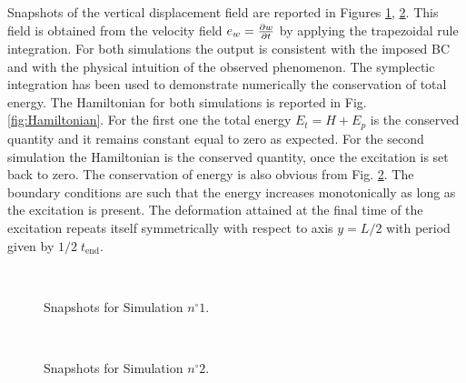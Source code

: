 \documentclass[11t]{article}
\begin{document}
Snapshots of the vertical displacement field are reported in Figures \ref{fig:sim1}, \ref{fig:sim2}. This field is obtained from the velocity field $e_w = \diffp{w}{t}$ by applying the trapezoidal rule integration. For both simulations the output is consistent with the imposed BC and with the physical intuition of the observed phenomenon. The symplectic integration has been used to demonstrate numerically the conservation of total energy. The Hamiltonian for both simulations is reported in Fig. \ref{fig:Hamiltonian}. For the first one the total energy $E_t = H + E_p$ is the conserved quantity and it remains constant equal to zero as expected. For the second simulation the Hamiltonian is the conserved quantity, once the excitation is set back to zero. The conservation of energy is also obvious from Fig. \ref{fig:sim2}. The boundary conditions are such that the energy increases monotonically as long as the excitation is present.  The deformation attained at the final time of the excitation  repeats itself symmetrically with respect to axis $y = L/2$ with period given by $1/2 \; t_{\text{end}}$.
\begin{figure}[t]%
	\centering
	\hspace{8pt}%
	 \\
	\hspace{8pt}%
	\caption[Snapshots of the displacement field]{Snapshots for Simulation $n^\circ 1$.}%
	\label{fig:sim1}%
\end{figure}
\begin{figure}[h]%
	\centering
	\hspace{8pt}%
	 \\
	\hspace{8pt}%
	\caption[Snapshots of the displacement field]{Snapshots for Simulation $n^\circ 2$.}%
	\label{fig:sim2}%
\end{figure}
\end{document}
